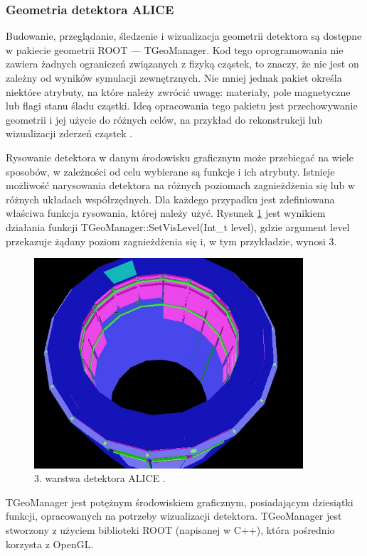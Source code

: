 \subsubsection{Geometria detektora ALICE}
Budowanie, przeglądanie, śledzenie i wizualizacja geometrii detektora są dostępne w pakiecie geometrii ROOT --- TGeoManager. Kod tego oprogramowania nie zawiera żadnych ograniczeń związanych z fizyką cząstek, to znaczy, że nie jest on zależny od wyników symulacji zewnętrznych. Nie mniej jednak pakiet określa niektóre atrybuty, na które należy zwrócić uwagę: materiały, pole magnetyczne lub flagi stanu śladu cząstki. Ideą opracowania tego pakietu jest przechowywanie geometrii i jej użycie do różnych celów, na przykład do rekonstrukcji lub wizualizacji zderzeń cząstek \cite{TGeoManager}.

Rysowanie detektora w danym środowisku graficznym może przebiegać na wiele sposobów, w zależności od celu wybierane są funkcje i ich atrybuty. Istnieje możliwość narysowania detektora na różnych poziomach zagnieżdżenia się lub w różnych układach współrzędnych. Dla każdego przypadku jest zdefiniowana właściwa funkcja rysowania, której należy użyć. Rysunek \ref{rys27} jest wynikiem działania funkcji TGeoManager::SetVisLevel(Int\_t level), gdzie argument level przekazuje żądany poziom zagnieżdżenia się i, w tym przykładzie, wynosi 3.

\begin{figure}[H]
		\centering
 		\includegraphics[width=10.0cm]{geometry.jpg}
    	\caption{3. warstwa detektora ALICE \cite{TGeoManager}.}
 		\label{rys27}
\end{figure}

TGeoManager jest potężnym środowiskiem graficznym, posiadającym dziesiątki funkcji, opracowanych na potrzeby wizualizacji detektora. TGeoManager jest stworzony z użyciem biblioteki ROOT (napisanej w C++), która pośrednio korzysta z OpenGL.

